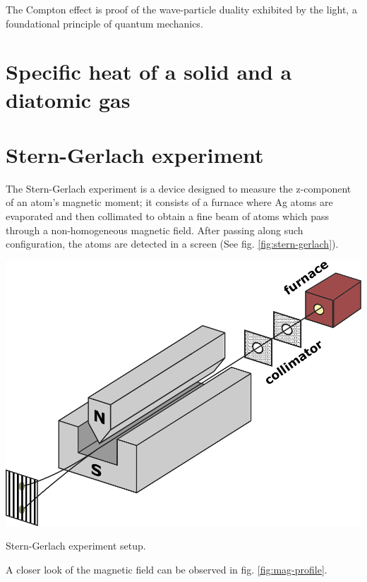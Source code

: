 \documentclass{article}
\begin{document}
The Compton effect is proof of the wave-particle duality exhibited by the light, a foundational principle of quantum mechanics.

\section{Specific heat of a solid and a diatomic gas}


\section{Stern-Gerlach experiment}
The Stern-Gerlach experiment is a device designed to measure the z-component of an atom's magnetic moment; it consists of a furnace where Ag atoms are evaporated and then collimated to obtain a fine beam of atoms which pass through a non-homogeneous magnetic field. After passing along such configuration, the atoms are detected in a screen (See fig. \ref{fig:stern-gerlach}). 
\begin{marginfigure}%
  \includegraphics[width=\linewidth]{figures/stern-gerlach-setup.pdf}
  \caption{Stern-Gerlach experiment setup.}
  \label{fig:stern-gerlach}
\end{marginfigure}
A closer look of the magnetic field can be observed in fig. \ref{fig:mag-profile}.
\end{document}

